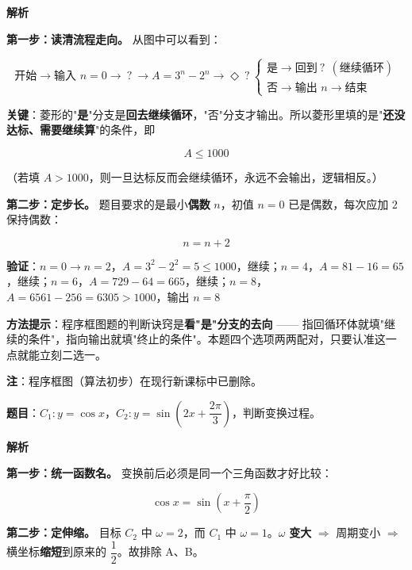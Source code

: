 \begin{center}\end{center}

\textbf{解析}

\textbf{第一步：读清流程走向。} 从图中可以看到：

\[\text{开始}\to\text{输入 }n=0\to\boxed{\ ?\ }\to A=3^{n}-2^{n}\to\Diamond\ ?\ \begin{cases}\text{是}\to\text{回到}\boxed{\ ?\ }\ (\text{继续循环})\\[1mm]\text{否}\to\text{输出 }n\to\text{结束}\end{cases}\]

\textbf{关键}：菱形的"\textbf{是}"分支是\textbf{回去继续循环}，"否"分支才输出。所以菱形里填的是"\textbf{还没达标、需要继续算}"的条件，即

\[A\le1000\]

（若填 $A>1000$，则一旦达标反而会继续循环，永远不会输出，逻辑相反。）

\textbf{第二步：定步长。} 题目要求的是最小\textbf{偶数} $n$，初值 $n=0$ 已是偶数，每次应加 $2$ 保持偶数：

\[n=n+2\]

\textbf{验证}：$n=0\to n=2$，$A=3^{2}-2^{2}=5\le1000$，继续；$n=4$，$A=81-16=65$，继续；$n=6$，$A=729-64=665$，继续；$n=8$，$A=6561-256=6305>1000$，输出 $n=8$ 


\begin{gktip}
\textbf{方法提示}：程序框图题的判断诀窍是\textbf{看"是"分支的去向} —— 指回循环体就填"继续的条件"，指向输出就填"终止的条件"。本题四个选项两两配对，只要认准这一点就能立刻二选一。

\textbf{注}：程序框图（算法初步）在现行新课标中已删除。
\end{gktip}

\par\medskip


\textbf{题目}：$C_1:y=\cos x$，$C_2:y=\sin\left(2x+\dfrac{2\pi}3\right)$，判断变换过程。

\textbf{解析}

\textbf{第一步：统一函数名。} 变换前后必须是同一个三角函数才好比较：

\[\cos x=\sin\left(x+\frac\pi2\right)\]

\textbf{第二步：定伸缩。} 目标 $C_2$ 中 $\omega=2$，而 $C_1$ 中 $\omega=1$。$\omega$ \textbf{变大} $\Rightarrow$ 周期变小 $\Rightarrow$ 横坐标\textbf{缩短}到原来的 $\dfrac12$。故排除 A、B。

